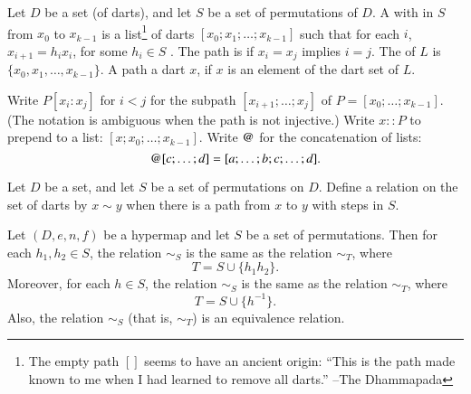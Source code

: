 \begin{definition}[path] 
Let $D$ be a set (of darts), and let $S$ be a set of permutations of $D$.
A  with  in $S$
from $x_0$ to $x_{k-1}$ is a list\footnote{The empty path $[]$ seems
to have an ancient origin: ``This is the path made known to me
when I had learned to remove all darts.'' --The Dhammapada} of
darts $[x_0;x_1;\ldots;x_{k-1}]$ such that for each $i$, $x_{i+1} = h_i x_i$,
for some $h_i \in S$  .    The
path is  if $x_i=x_j$ implies $i=j$. 
The  of $L$ is $\{x_0,x_1,\ldots,x_{k-1}\}$.  A path 
a dart $x$, if $x$ is an element of the dart set of $L$.
\end{definition}

\begin{notation}[$::$,~$\opat$]
Write $P[x_i:x_j]$ for $i<j$ for the subpath $[x_{i+1};\ldots;x_j]$ of
$P=[x_0;\ldots;x_{k-1}]$.  (The notation is ambiguous when the path is
not injective.)  Write $x::P$ to prepend to a list:
$[x;x_0;\ldots;x_{k-1}]$.  Write $\opat$ for the concatenation of
lists:
\begin{displaymath}
[a;\ldots;b] \opat [c;\ldots;d]  = [a;\ldots;b;c;\ldots;d].
\end{displaymath}
\end{notation}
%
%
%


\begin{definition}[$\sim_S$]
Let $D$ be a set, and let $S$ be a 
set of permutations on $D$.
Define a relation on the set of darts by $x\sim y$ when there is a
path from $x$ to $y$ with steps in $S$.
\end{definition}

\begin{lemma}\guid{}\label{lemma:er} %
Let $(D,e,n,f)$ be a hypermap and let $S$ be a  set of permutations.
Then for each $h_1,h_2\in S$, 
the relation $\sim_S$ is the same as the relation $\sim_T$, where
\begin{displaymath}
T = S \cup \{h_1h_2\}.
\end{displaymath}
Moreover, for each $h\in S$, 
the relation $\sim_S$ is the same as the relation $\sim_T$, where
\begin{displaymath}
T = S \cup \{h^{-1}\}.
\end{displaymath}
Also,  the relation $\sim_S$ (that is, $\sim_T$) is an equivalence relation.  
%
\end{lemma}

